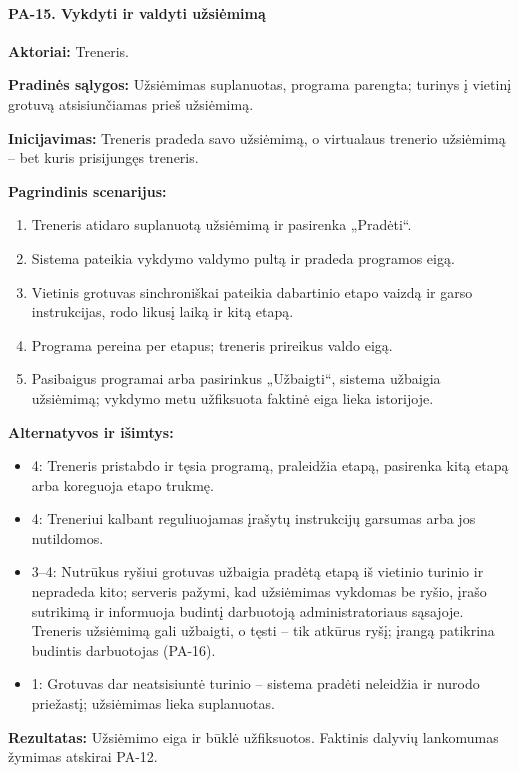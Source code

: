 \paragraph{PA-15. Vykdyti ir valdyti užsiėmimą}\mbox{}\par
\textbf{Aktoriai:} Treneris.\par
\textbf{Pradinės sąlygos:} Užsiėmimas suplanuotas, programa parengta; turinys į vietinį grotuvą atsisiunčiamas prieš užsiėmimą.\par
\textbf{Inicijavimas:} Treneris pradeda savo užsiėmimą, o virtualaus trenerio užsiėmimą -- bet kuris prisijungęs treneris.\par
\textbf{Pagrindinis scenarijus:}
\begin{enumerate}
\item Treneris atidaro suplanuotą užsiėmimą ir pasirenka „Pradėti“.
\item Sistema pateikia vykdymo valdymo pultą ir pradeda programos eigą.
\item Vietinis grotuvas sinchroniškai pateikia dabartinio etapo vaizdą ir garso instrukcijas, rodo likusį laiką ir kitą etapą.
\item Programa pereina per etapus; treneris prireikus valdo eigą.
\item Pasibaigus programai arba pasirinkus „Užbaigti“, sistema užbaigia užsiėmimą; vykdymo metu užfiksuota faktinė eiga lieka istorijoje.
\end{enumerate}
\textbf{Alternatyvos ir išimtys:}
\begin{itemize}
\item 4: Treneris pristabdo ir tęsia programą, praleidžia etapą, pasirenka kitą etapą arba koreguoja etapo trukmę.
\item 4: Treneriui kalbant reguliuojamas įrašytų instrukcijų garsumas arba jos nutildomos.
\item 3--4: Nutrūkus ryšiui grotuvas užbaigia pradėtą etapą iš vietinio turinio ir nepradeda kito; serveris pažymi, kad užsiėmimas vykdomas be ryšio, įrašo sutrikimą ir informuoja budintį darbuotoją administratoriaus sąsajoje. Treneris užsiėmimą gali užbaigti, o tęsti -- tik atkūrus ryšį; įrangą patikrina budintis darbuotojas (PA-16).
\item 1: Grotuvas dar neatsisiuntė turinio -- sistema pradėti neleidžia ir nurodo priežastį; užsiėmimas lieka suplanuotas.
\end{itemize}
\textbf{Rezultatas:} Užsiėmimo eiga ir būklė užfiksuotos. Faktinis dalyvių lankomumas žymimas atskirai PA-12.\par
{}
